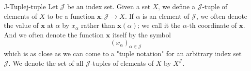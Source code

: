 \begin{definition}
{J-Tuple}{j-tuple}
Let \(\mathcal{J}\) be an index set. Given a set \(X\), we define a
\(\mathcal{J}\)-tuple of elements of \(X\) to be a function \(\mathbf{x}:
\mathcal{J} \rightarrow X \). If \(\alpha\) is an element of \(\mathcal{J}\), we
often denote the value of \(\mathbf{x}\) at \(\alpha\) by \(x_{\alpha}\) rather
than \(\mathbf{x}(\alpha)\); we call it the \(\alpha\)-th coordinate of
\(\mathbf{x}\). And we often denote the function \(\mathbf{x}\) itself by the
symbol
\[
\left(x_{\alpha}\right)_{\alpha \in \mathcal{J}}
\]
which is as close as we can come to a "tuple notation" for an arbitrary index
set \(\mathcal{J}\). We denote the set of all \(\mathcal{J}\)-tuples of elements
of \(X\) by \(X^{\mathcal{J}}\).
\end{definition}
